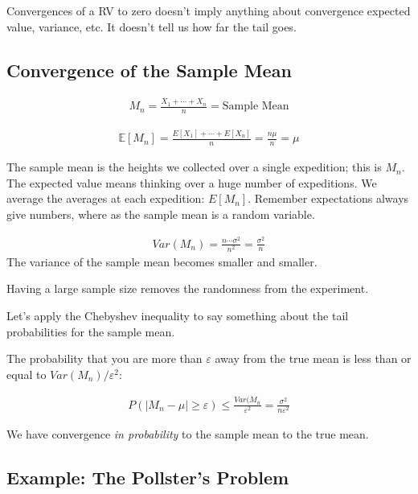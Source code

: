 \documentclass{article}
\begin{document}
 Convergences of a RV to zero doesn't imply anything about  convergence expected value, variance, etc.  It doesn't tell us how far the tail goes.

\subsection{Convergence of the Sample Mean}


\begin{align*}
    M_n = \frac{X_1 + \cdots + X_n}{n} = \text{Sample Mean}
\end{align*}

\begin{align*}
    \mathbb{E}[M_n] = \frac{E[X_1] + \cdots + E[X_n]}{n} = \frac{n \mu}{n} = \mu
\end{align*}

 The sample mean is the heights we collected over a single expedition; this is $M_n$.  The expected value means thinking over a huge number of expeditions.  We average the averages at each expedition: $E[M_n]$.  Remember expectations always give numbers, where as the sample mean is a random variable.

\begin{align*}
    Var(M_n) = \frac{n \cdots \sigma^2}{n^2} = \frac{\sigma^2}{n}
\end{align*}
The variance of the sample mean becomes smaller and smaller.

Having a large sample size removes the randomness from the experiment.

Let's apply the Chebyshev inequality to say something about the tail probabilities for the sample mean.

The probability that you are more than $\varepsilon$ away from the true mean is less than or equal to $Var(M_n)/\varepsilon^2$:

\begin{align}
    P(|M_n - \mu| \ge \varepsilon) \le \frac{Var(M_n}{\varepsilon^2} = \frac{\sigma^2}{n \varepsilon^2}
\end{align}

We have convergence \emph{in probability} to the sample mean to the true mean.

\subsection{Example: The Pollster’s Problem}
\end{document}
